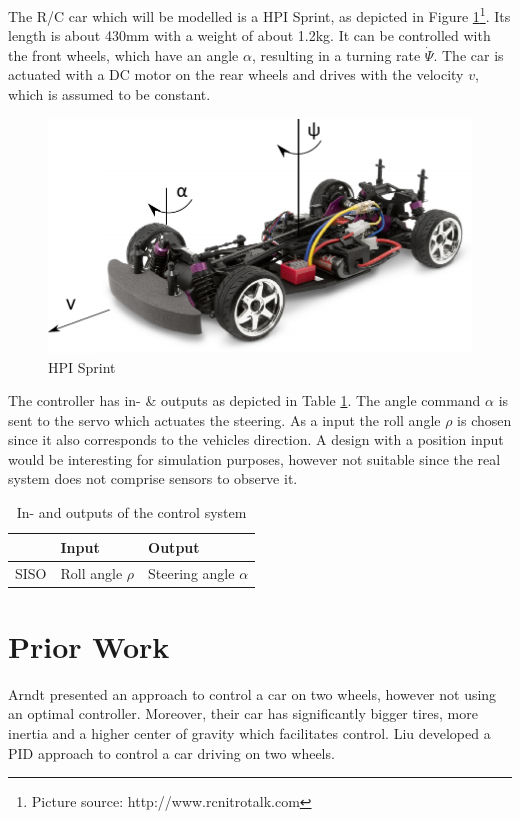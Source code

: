 \documentclass[conference]{IEEEtran}
\begin{document}
The R/C car which will be modelled is a HPI Sprint, as depicted in Figure \ref{figure:hpi_sprint}\footnote{Picture source: http://www.rcnitrotalk.com}. Its length is about 430mm with a weight of about 1.2kg. It can be controlled with the front wheels, which have an angle $\alpha$, resulting in a turning rate $\dot \Psi$. The car is actuated with a DC motor on the rear wheels and drives with the velocity $v$, which is assumed to be constant.  

\begin{figure}[h!]
\centering
  \includegraphics[width=.3\textwidth]{pics/hpisprintgeom.pdf} 
  \caption{HPI Sprint}  
  \label{figure:hpi_sprint}
\end{figure}

The controller has in- \& outputs as depicted in Table \ref{figure:controlinout}. The angle command $\alpha$ is sent to the servo which actuates the steering. As a input the roll angle $\rho$ is chosen since it also corresponds to the vehicles direction. A design with a position input would be interesting for simulation purposes, however not suitable since the real system does not comprise sensors to observe it.

\begin{table}[h]
\begin{center}
\begin{tabular}{|l||l|l|}
\hline
 		& Input 		& Output\\
\hline
SISO 	& Roll angle $\rho$ 	& Steering angle $\alpha$\\
\hline
\end{tabular}
\caption{In- and outputs of the control system}  
\label{figure:controlinout}
\end{center}
\end{table}


\section{Prior Work}

Arndt \cite{bib:arndt} presented an approach to control a car on two wheels, however not using an optimal controller. Moreover, their car has significantly bigger tires, more inertia and a higher center of gravity which facilitates control. Liu \cite{bib:liu} developed a PID approach to control a car driving on two wheels.
\end{document}
